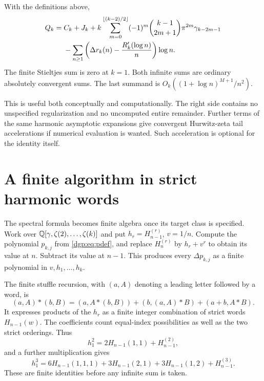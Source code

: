 \begin{corollary}
\label{dgp:cor:ordinary-all}
With the definitions above,
\begin{align}
 Q_k={}&C_k+J_k+
 k\sum_{m=0}^{\lfloor(k-2)/2\rfloor}
       (-1)^m\binom{k-1}{2m+1}\pi^{2m}\gamma_{k-2m-1}
 \notag\\
 &-\sum_{n\ge1}
   \left(\Delta r_k(n)-\frac{R_k'(\log n)}n\right)\log n.
 \label{dgp:eq:ordinary-all}
\end{align}
The finite Stieltjes sum is zero at $k=1$.  Both infinite sums are
ordinary absolutely convergent sums.  The last summand is
$O_k((1+\log n)^{M+1}/n^2)$.
\end{corollary}

This is useful both conceptually and computationally.  The right side
contains no unspecified regularization and no uncomputed entire
remainder.  Further terms of the same harmonic asymptotic expansions
give convergent Hurwitz-zeta tail accelerations if numerical evaluation
is wanted.  Such acceleration is optional for the identity itself.

\section{A finite algorithm in strict harmonic words}
\label{dgp:sec:algorithm}

The spectral formula becomes finite algebra once its target class is
specified.  Work over $\mathbb{Q}[\gamma,\zeta(2),\ldots,\zeta(k)]$ and put
$h_r=H_{n-1}^{(r)}$, $v=1/n$.  Compute the polynomial
$p_{k,j}$ from \eqref{dgp:eq:pdef}, and replace $H_n^{(r)}$ by
$h_r+v^r$ to obtain its value at $n$.  Subtract its value at $n-1$.
This produces every $\Delta p_{k,j}$ as a finite polynomial in
$v,h_1,\ldots,h_k$.

The finite stuffle recursion, with $(a,A)$ denoting a leading letter
followed by a word, is
\begin{equation}
 (a,A)*(b,B)=(a,A*(b,B))+(b,(a,A)*B)+(a+b,A*B).
 \label{dgp:eq:stuffle}
\end{equation}
It expresses products of the $h_r$ as a finite integer combination
of strict words $H_{n-1}(w)$.  The coefficients count equal-index
possibilities as well as the two strict orderings.  Thus
\[
        h_1^2=2H_{n-1}(1,1)+H_{n-1}^{(2)},
\]
and a further multiplication gives
\[
 h_1^3=6H_{n-1}(1,1,1)+3H_{n-1}(2,1)
                  +3H_{n-1}(1,2)+H_{n-1}^{(3)}.
\]
These are finite identities before any infinite sum is taken.

